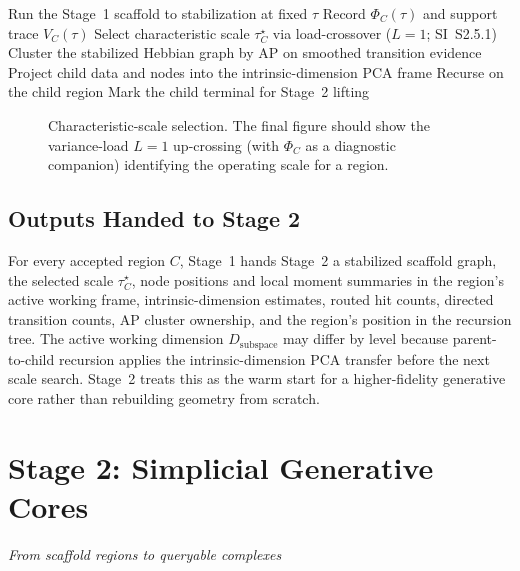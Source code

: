 \documentclass[11pt]{article}
\newcommand{\sectionsubtitle}[1]{\vspace{-0.25em}\noindent\textit{#1}\par\vspace{0.75em}}
\theoremstyle{definition}
\theoremstyle{plain}
\begin{document}
\begin{algorithm}[t]
\caption{Stage 1 scale discovery (paper view)}
\label{alg:paper-stage1}
\begin{algorithmic}[1]
        \State Run the Stage~1 scaffold to stabilization at fixed $\tau$
        \State Record $\Phi_C(\tau)$ and support trace $V_C(\tau)$
    \EndFor
    \State Select characteristic scale $\tau_C^\star$ via load-crossover ($L=1$; SI~S2.5.1)
    \State Cluster the stabilized Hebbian graph by AP on smoothed transition evidence
            \State Project child data and nodes into the intrinsic-dimension PCA frame
            \State Recurse on the child region
        \Else
            \State Mark the child terminal for Stage~2 lifting
        \EndIf
    \EndFor
\EndProcedure
\end{algorithmic}
\end{algorithm}

\begin{figure}[t]
    \centering
    \caption{Characteristic-scale selection. The final figure should show the variance-load $L=1$ up-crossing (with $\Phi_C$ as a diagnostic companion) identifying the operating scale for a region.}
    \label{fig:scale-response}
\end{figure}

\subsection{Outputs Handed to Stage 2}
For every accepted region $C$, Stage~1 hands Stage~2 a stabilized scaffold graph, the selected scale $\tau_C^\star$, node positions and local moment summaries in the region's active working frame, intrinsic-dimension estimates, routed hit counts, directed transition counts, AP cluster ownership, and the region's position in the recursion tree. The active working dimension $D_{\mathrm{subspace}}$ may differ by level because parent-to-child recursion applies the intrinsic-dimension PCA transfer before the next scale search. Stage~2 treats this as the warm start for a higher-fidelity generative core rather than rebuilding geometry from scratch.

\section{Stage 2: Simplicial Generative Cores}
\label{sec:stage2}
\sectionsubtitle{From scaffold regions to queryable complexes}
\end{document}
